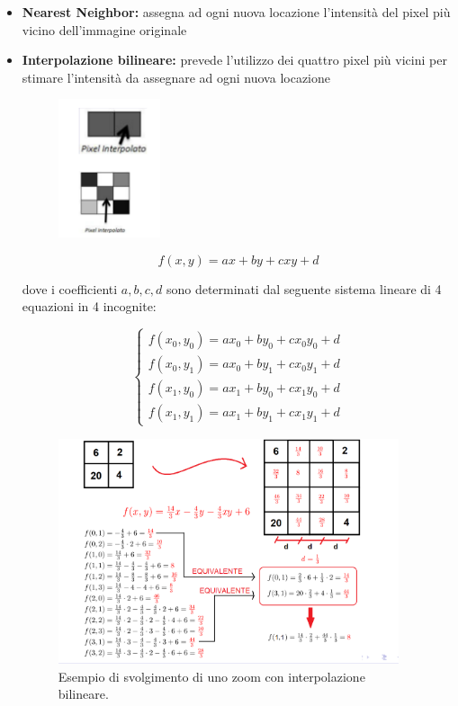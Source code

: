 \begin{itemize}
    \item \textbf{Nearest Neighbor:} assegna ad ogni nuova locazione l'intensità
          del pixel più vicino dell'immagine originale

    \item \textbf{Interpolazione bilineare:} prevede l'utilizzo dei quattro
          pixel più vicini per stimare l'intensità da assegnare ad ogni nuova
          locazione

          \begin{figure}[H]
              \centering
              \includegraphics[width=3cm, keepaspectratio]{capitoli/immagini/imgs/esempio-interpolazione.png}
          \end{figure}

          $$
              f(x,y)=ax+by+cxy+d
          $$

          dove i coefficienti $a, b, c, d$ sono determinati dal seguente sistema
          lineare di 4 equazioni in 4 incognite:

          $$
              \left\{\begin{array}{l}
                  f\left(x_0, y_0\right)=a x_0+b y_0+c x_0 y_0+d \\
                  f\left(x_0, y_1\right)=a x_0+b y_1+c x_0 y_1+d \\
                  f\left(x_1, y_0\right)=a x_1+b y_0+c x_1 y_0+d \\
                  f\left(x_1, y_1\right)=a x_1+b y_1+c x_1 y_1+d
              \end{array}\right.
          $$

          \begin{figure}[H]
              \centering
              \includegraphics[width=10cm, keepaspectratio]{capitoli/immagini/imgs/calcolo_bilineare.png}
              \caption{Esempio di svolgimento di uno zoom con interpolazione bilineare.}
          \end{figure}


\end{itemize}
